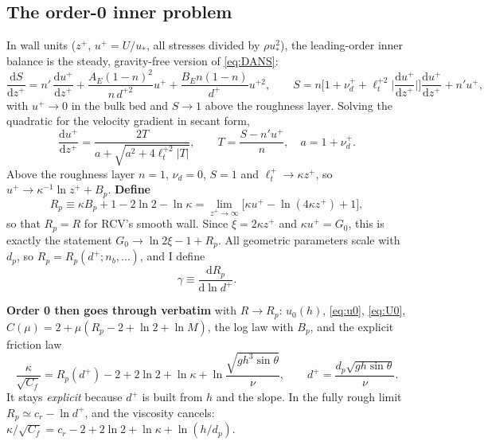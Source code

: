 \documentclass[10pt,a4paper]{article}
\newcommand{\dd}{\mathrm{d}}
\newcommand{\Rp}{R_p}
\begin{document}
\subsection{The order-0 inner problem}
In wall units ($z^+$, $u^+=U/u_*$, all stresses divided by $\rho u_*^2$), the leading-order inner balance is the steady, gravity-free version of \eqref{eq:DANS}:
\begin{equation}\label{eq:innerP}
\frac{\dd S}{\dd z^+}=n'\,\frac{\dd u^+}{\dd z^+}+\frac{A_E(1-n)^2}{n\,d^{+2}}u^++\frac{B_En(1-n)}{d^+}u^{+2},\qquad
S=n\Big[1+\nu_d^++\ell_t^{+2}\Big|\frac{\dd u^+}{\dd z^+}\Big|\Big]\frac{\dd u^+}{\dd z^+}+n'u^+,
\end{equation}
with $u^+\to0$ in the bulk bed and $S\to1$ above the roughness layer. Solving the quadratic for the velocity gradient in secant form,
\begin{equation}
\frac{\dd u^+}{\dd z^+}=\frac{2T}{a+\sqrt{a^2+4\ell_t^{+2}|T|}},\qquad T=\frac{S-n'u^+}{n},\quad a=1+\nu_d^+ .
\end{equation}
Above the roughness layer $n=1$, $\nu_d=0$, $S=1$ and $\ell_t^+\to\kappa z^+$, so $u^+\to\kappa^{-1}\ln z^++B_p$. \textbf{Define}
\begin{equation}\label{eq:Rp}
\Rp\equiv\kappa B_p+1-2\ln2-\ln\kappa=\lim_{z^+\to\infty}\big[\kappa u^+-\ln(4\kappa z^+)+1\big],
\end{equation}
so that $\Rp=R$ for RCV's smooth wall. Since $\xi=2\kappa z^+$ and $\kappa u^+=G_0$, this is exactly the statement $G_0\to\ln2\xi-1+\Rp$. All geometric parameters scale with $d_p$, so $\Rp=\Rp(d^+;n_b,\ldots)$, and I define
\begin{equation}
\gamma\equiv\frac{\dd\Rp}{\dd\ln d^+}.
\end{equation}

\textbf{Order 0 then goes through verbatim} with $R\to\Rp$: $u_0(h)$, \eqref{eq:u0}, \eqref{eq:U0}, $C(\mu)=2+\mu(\Rp-2+\ln2+\ln M)$, the log law with $B_p$, and the explicit friction law
\begin{equation}\label{eq:Cfp}
\frac{\kappa}{\sqrt{C_f}}=\Rp(d^+)-2+2\ln2+\ln\kappa+\ln\frac{\sqrt{gh^3\sin\theta}}{\nu},\qquad d^+=\frac{d_p\sqrt{gh\sin\theta}}{\nu}.
\end{equation}
It stays \emph{explicit} because $d^+$ is built from $h$ and the slope. In the fully rough limit $\Rp\simeq c_r-\ln d^+$, and the viscosity cancels: $\kappa/\sqrt{C_f}=c_r-2+2\ln2+\ln\kappa+\ln(h/d_p)$.
\end{document}
